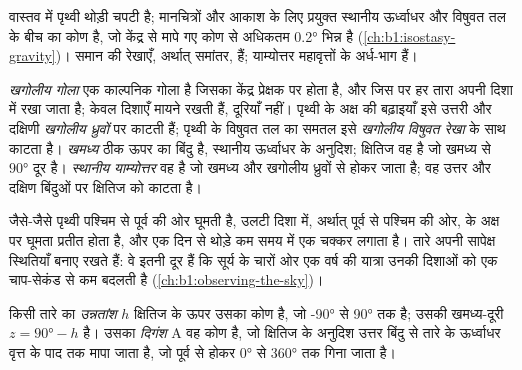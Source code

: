 वास्तव में पृथ्वी थोड़ी चपटी है; मानचित्रों और आकाश के लिए प्रयुक्त  स्थानीय ऊर्ध्वाधर
और विषुवत तल के बीच का कोण है, जो केंद्र से मापे गए कोण से अधिकतम \ang{0.2} भिन्न है
(\cref{ch:b1:isostasy-gravity})। समान  की रेखाएँ, अर्थात् समांतर,  हैं;
याम्योत्तर महावृत्तों के अर्ध-भाग हैं।

\begin{definition}[खगोलीय गोला]\label{def:b1:spherical-astronomy:celestial-sphere}
\emph{खगोलीय गोला} एक काल्पनिक गोला है जिसका केंद्र प्रेक्षक पर होता है,
और जिस पर हर तारा अपनी दिशा में रखा जाता है; केवल दिशाएँ मायने रखती हैं, दूरियाँ नहीं।
पृथ्वी के अक्ष की बढ़ाइयाँ इसे उत्तरी और दक्षिणी \emph{खगोलीय ध्रुवों}
पर काटती हैं; पृथ्वी के विषुवत तल का समतल इसे \emph{खगोलीय विषुवत रेखा} के साथ काटता है। \emph{खमध्य} ठीक ऊपर का बिंदु है, स्थानीय
ऊर्ध्वाधर के अनुदिश; क्षितिज वह  है जो खमध्य से $\ang{90}$ दूर है।
\emph{स्थानीय याम्योत्तर} वह  है जो खमध्य और खगोलीय ध्रुवों
से होकर जाता है; वह उत्तर और दक्षिण बिंदुओं पर क्षितिज को काटता है।
\end{definition}

जैसे-जैसे पृथ्वी पश्चिम से पूर्व की ओर घूमती है,  उलटी दिशा में, अर्थात्
पूर्व से पश्चिम की ओर,  के अक्ष पर घूमता प्रतीत होता है, और एक दिन से
थोड़े कम समय में एक चक्कर लगाता है। तारे अपनी सापेक्ष स्थितियाँ बनाए रखते हैं: वे इतनी
दूर हैं कि सूर्य के चारों ओर एक वर्ष की यात्रा उनकी दिशाओं को एक चाप-सेकंड से कम बदलती
है (\cref{ch:b1:observing-the-sky})।

\begin{definition}[क्षैतिज निर्देशांक]\label{def:b1:spherical-astronomy:horizontal}
किसी तारे का \emph{उन्नतांश} $h$ क्षितिज के ऊपर उसका कोण है, जो
\ang{-90} से \ang{90} तक है; उसकी खमध्य-दूरी $z = \ang{90} - h$ है। उसका \emph{दिगंश}
$\mathrm{A}$ वह कोण है, जो क्षितिज के अनुदिश उत्तर बिंदु से तारे के ऊर्ध्वाधर वृत्त के पाद तक
मापा जाता है, जो पूर्व से होकर \ang{0} से \ang{360} तक गिना जाता है।
\end{definition}

